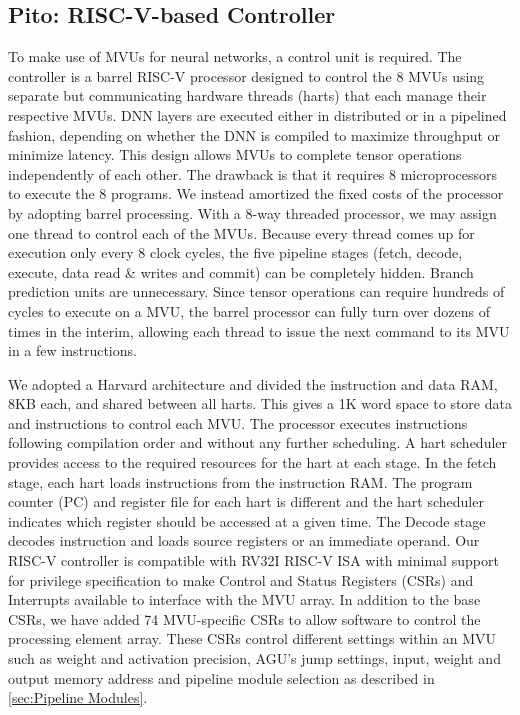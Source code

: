\documentclass[sigconf]{acmart}
\newcommand{\MVU}{MVU}
\newcommand{\Pito}{Pito: RISC-V-based Controller}
\newcommand{\barrel}{barrel}
\begin{document}
\subsection{\Pito{}}

To make use of \MVU{}s for neural networks, a control unit is required. The controller is a \barrel{} RISC-V processor designed to control the 8 \MVU{}s using separate but communicating hardware threads (harts) that each manage their respective \MVU{}s. DNN layers are executed either in distributed or in a pipelined fashion, depending on whether the DNN is compiled to maximize throughput or minimize latency. This design allows \MVU{}s to complete tensor operations independently of each other. The drawback is that it requires 8 microprocessors to execute the 8 programs. We instead amortized the fixed costs of the processor by adopting \barrel{} processing. With a 8-way threaded processor, we may assign one thread to control each of the \MVU{}s. Because every thread comes up for execution only every 8 clock cycles, the five pipeline stages (fetch, decode, execute, data read \& writes and commit) can be completely hidden. Branch prediction units are unnecessary. Since tensor operations can require hundreds of cycles to execute on a \MVU{}, the \barrel{} processor can fully turn over dozens of times in the interim, allowing each thread to issue the next command to its \MVU{} in a few instructions.

%
We adopted a Harvard architecture and divided the instruction and data RAM, 8KB each, and shared between all harts. This gives a 1K word space to store data and instructions to control each \MVU{}. The processor executes instructions following compilation order and without any further scheduling. A hart scheduler provides access to the required resources for the hart at each stage. In the fetch stage, each hart loads instructions from the instruction RAM. The program counter (PC) and register file for each hart is different and the hart scheduler indicates which register should be accessed at a given time. The Decode stage decodes instruction and loads source registers or an immediate operand. Our RISC-V controller is compatible with RV32I RISC-V ISA with minimal support for privilege specification to make Control and Status Registers (CSRs) and Interrupts available to interface with the \MVU{} array. In addition to the base CSRs, we have added 74 \MVU{}-specific CSRs to allow software to control the processing element array. These CSRs control different settings within an MVU such as weight and activation precision, AGU's jump settings, input, weight and output memory address and pipeline module selection as described in \ref{sec:Pipeline Modules}. 
\end{document}

